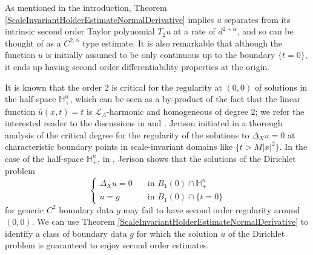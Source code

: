 \documentclass[12pt]{amsart}
\def \H {{\mathbb H}}
\def \L {\mathcal{L}}
\def \a {\alpha}
\begin{document}
As mentioned in the introduction, Theorem \ref{ScaleInvariantHolderEstimateNormalDerivative} implies $u$ separates from its intrinsic second order Taylor polynomial $T_2u$ at a rate of $d^{2+\a}$, and so can be thought of as a $C^{2,\a}$ type estimate.
It is also remarkable that although the function $u$ is initially assumed to be only continuous up to the boundary $\{t=0\}$, it ends up having second order differentiability properties at the origin.

It is known that the order $2$ is critical for the regularity at $(0,0)$ of solutions in the half-space $\H^n_+$, which can be seen as a by-product of the fact that the linear function $\bar{u}(x,t)=t$ is $\L_A$-harmonic and homogeneous of degree $2$; we refer the interested reader to the discussions in \cite[Remarque on pg. 106]{Gaveau} and \cite[pg. 235]{Jerison81-2}. Jerison initiated in \cite{Jerison81-2} a thorough analysis of the critical degree for the regularity of the solutions to $\Delta_X u=0$ at characteristic boundary points in scale-invariant domains like $\{t>M |x|^2\}$. In the case of the half-space $\H^n_+$, in \cite[Section 5]{Jerison81-2}, Jerison shows that the solutions of the Dirichlet problem 
\[
\begin{cases}
\Delta_X u = 0 & \quad \text{in } B_1(0) \cap \H^n_+\\
u = g & \quad \text{in } B_1(0) \cap \{t =0\}
\end{cases}
\]
for generic $C^2$ boundary data $g$ may fail to have second order regularity around $(0,0)$. We can use Theorem \ref{ScaleInvariantHolderEstimateNormalDerivative} to identify a class of boundary data $g$ for which the solution $u$ of the Dirichlet problem is guaranteed to enjoy second order estimates.
\end{document}
